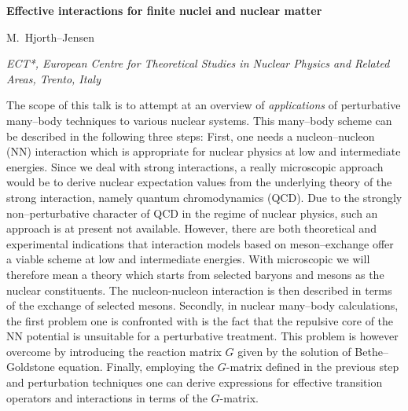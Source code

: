 \pagestyle{empty}
%
%
%
%
%
\topmargin=0in\headheight=0in\headsep=0in\footheight=1in\oddsidemargin=7.2pt
\evensidemargin=7.2pt\marginparwidth=20mm\marginparsep=5mm
\textheight=23.8cm
\textwidth=16.8cm
%

\begin{center}{\large {\bf 
Effective interactions for finite nuclei and nuclear matter}}
\end{center}
\begin{center}
M.\ Hjorth--Jensen
\end{center}

\begin{center}
{\small\it
ECT*, European Centre for Theoretical
Studies in Nuclear Physics and Related Areas, Trento, Italy
}
\end{center}



The scope of this talk is to attempt at an overview of {\em applications}
of perturbative many--body techniques to various
nuclear systems.
This many--body scheme can be described in the following three steps:
\newline
First, one needs a nucleon--nucleon (NN) interaction which is
appropriate for nuclear physics at low and
intermediate energies.
Since we deal with strong interactions, a really
microscopic approach would be to derive nuclear expectation values
from the underlying theory of the strong interaction, namely
quantum chromodynamics (QCD). Due to the strongly
non--perturbative character of QCD in the regime of nuclear physics,
such an approach is at present not available. However, there are
both theoretical and experimental indications that interaction
models based on meson--exchange offer a viable scheme at low and
intermediate energies. With microscopic we will therefore
mean a theory which starts from selected baryons and mesons as the
nuclear constituents.
The nucleon-nucleon interaction is then described in terms of the
exchange of selected mesons.\newline
Secondly,
in nuclear many--body calculations, the first problem one is confronted
with is the fact
that the repulsive core of the NN potential is unsuitable for
a perturbative treatment. This problem is however overcome by
introducing the reaction matrix $G$ given by the solution
of Bethe--Goldstone equation.\newline
Finally,
employing the $G$-matrix defined in the previous step and 
perturbation techniques one
can derive expressions for effective transition operators and interactions
in terms of the
$G$-matrix.


